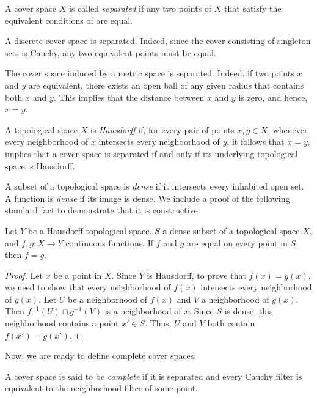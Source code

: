 \documentclass[pdflatex,sn-mathphys-num]{sn-jnl}
\theoremstyle{definition}
\theoremstyle{remark}
\numberwithin{figure}{section}
\begin{document}
\begin{defn}
A cover space $X$ is called \emph{separated} if any two points of $X$ that satisfy the equivalent conditions of  are equal.
\end{defn}

\begin{example}
A discrete cover space is separated.
Indeed, since the cover consisting of singleton sets is Cauchy, any two equivalent points must be equal.
\end{example}

\begin{example}
The cover space induced by a metric space is separated.
Indeed, if two points $x$ and $y$ are equivalent, there exists an open ball of any given radius that contains both $x$ and $y$.
This implies that the distance between $x$ and $y$ is zero, and hence, $x = y$.
\end{example}

A topological space $X$ is \emph{Hausdorff} if, for every pair of points $x,y \in X$, whenever every neighborhood of $x$ intersects every neighborhood of $y$, it follows that $x = y$.
 implies that a cover space is separated if and only if its underlying topological space is Hausdorff.

A subset of a topological space is \emph{dense} if it intersects every inhabited open set.
A function is \emph{dense} if its image is dense.
We include a proof of the following standard fact to demonstrate that it is constructive:

\begin{prop}
Let $Y$ be a Hausdorff topological space, $S$ a dense subset of a topological space $X$, and $f,g : X \to Y$ continuous functions.
If $f$ and $g$ are equal on every point in $S$, then $f = g$.
\end{prop}
\begin{proof}
Let $x$ be a point in $X$.
Since $Y$ is Hausdorff, to prove that $f(x) = g(x)$, we need to show that every neighborhood of $f(x)$ intersects every neighborhood of $g(x)$.
Let $U$ be a neighborhood of $f(x)$ and $V$ a neighborhood of $g(x)$.
Then $f^{-1}(U) \cap g^{-1}(V)$ is a neighborhood of $x$.
Since $S$ is dense, this neighborhood contains a point $x' \in S$.
Thus, $U$ and $V$ both contain $f(x') = g(x')$.
\end{proof}

Now, we are ready to define complete cover spaces:

\begin{defn}
A cover space is said to be \emph{complete} if it is separated and every Cauchy filter is equivalent to the neighborhood filter of some point.
\end{defn}
\end{document}
